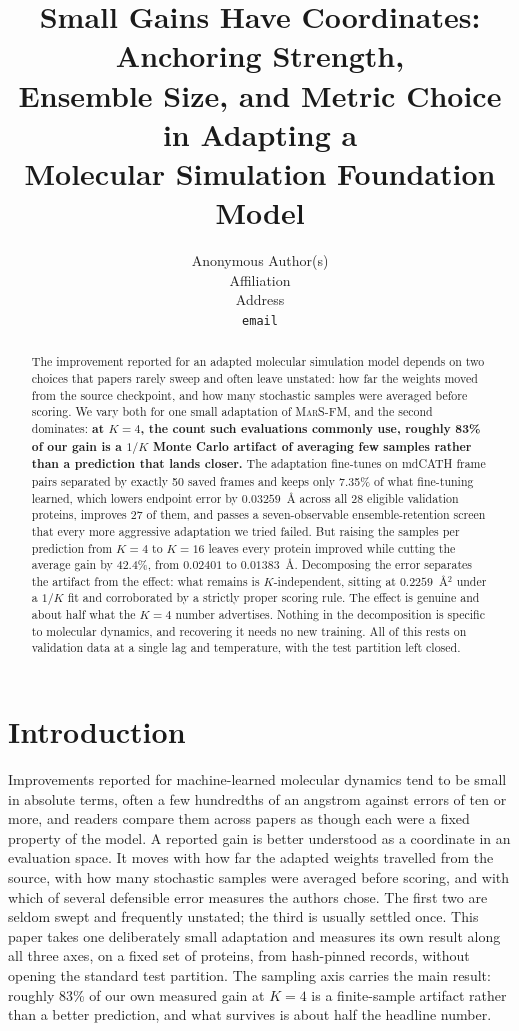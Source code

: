 \documentclass{article}
\title{Small Gains Have Coordinates: Anchoring Strength,\\Ensemble Size, and Metric Choice in Adapting a\\Molecular Simulation Foundation Model}
\author{%
  Anonymous Author(s) \\
  Affiliation \\
  Address \\
  \texttt{email} \\
}
\newcommand{\marsfm}{\textsc{MarS-FM}}
\begin{document}
\maketitle

\begin{abstract}
The improvement reported for an adapted molecular simulation model depends on two choices that papers rarely sweep and often leave unstated: how far the weights moved from the source checkpoint, and how many stochastic samples were averaged before scoring. We vary both for one small adaptation of \marsfm{}, and the second dominates: \textbf{at $K=4$, the count such evaluations commonly use, roughly 83\% of our gain is a $1/K$ Monte Carlo artifact of averaging few samples rather than a prediction that lands closer.} The adaptation fine-tunes on mdCATH frame pairs separated by exactly 50 saved frames and keeps only 7.35\% of what fine-tuning learned, which lowers endpoint error by $0.03259$~\AA{} across all 28 eligible validation proteins, improves 27 of them, and passes a seven-observable ensemble-retention screen that every more aggressive adaptation we tried failed. But raising the samples per prediction from $K=4$ to $K=16$ leaves every protein improved while cutting the average gain by 42.4\%, from $0.02401$ to $0.01383$~\AA{}. Decomposing the error separates the artifact from the effect: what remains is $K$-independent, sitting at $0.2259$~\AA$^2$ under a $1/K$ fit and corroborated by a strictly proper scoring rule. The effect is genuine and about half what the $K=4$ number advertises. Nothing in the decomposition is specific to molecular dynamics, and recovering it needs no new training. All of this rests on validation data at a single lag and temperature, with the test partition left closed.
\end{abstract}

\section{Introduction}

Improvements reported for machine-learned molecular dynamics tend to be small in absolute terms, often a few hundredths of an angstrom against errors of ten or more, and readers compare them across papers as though each were a fixed property of the model. A reported gain is better understood as a coordinate in an evaluation space. It moves with how far the adapted weights travelled from the source, with how many stochastic samples were averaged before scoring, and with which of several defensible error measures the authors chose. The first two are seldom swept and frequently unstated; the third is usually settled once. This paper takes one deliberately small adaptation and measures its own result along all three axes, on a fixed set of proteins, from hash-pinned records, without opening the standard test partition. The sampling axis carries the main result: roughly 83\% of our own measured gain at $K=4$ is a finite-sample artifact rather than a better prediction, and what survives is about half the headline number.
\end{document}
